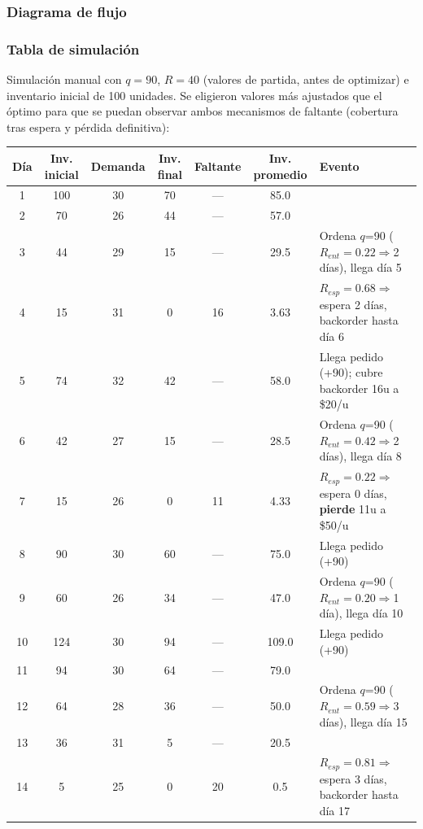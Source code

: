 \documentclass[12pt, a4paper]{article}
\begin{document}
\subsubsection{Diagrama de flujo}


\subsubsection{Tabla de simulación}

Simulación manual con $q=90$, $R=40$ (valores de partida, antes de optimizar) e inventario inicial de 100 unidades. Se eligieron valores más ajustados que el óptimo para que se puedan observar ambos mecanismos de faltante (cobertura tras espera y pérdida definitiva):

\begin{center}
\small
\begin{tabular}{ccccccl}
\toprule
Día & Inv. inicial & Demanda & Inv. final & Faltante & Inv. promedio & Evento \\
\midrule
1  & 100 & 30 & 70  & --- & 85.0  & \\
2  & 70  & 26 & 44  & --- & 57.0  & \\
3  & 44  & 29 & 15  & --- & 29.5  & Ordena $q$=90 ($R_{ent}=0.22\Rightarrow$2 días), llega día 5 \\
4  & 15  & 31 & 0   & 16  & 3.63  & $R_{esp}=0.68\Rightarrow$espera 2 días, backorder hasta día 6 \\
5  & 74  & 32 & 42  & --- & 58.0  & Llega pedido (+90); cubre backorder 16u a \$20/u \\
6  & 42  & 27 & 15  & --- & 28.5  & Ordena $q$=90 ($R_{ent}=0.42\Rightarrow$2 días), llega día 8 \\
7  & 15  & 26 & 0   & 11  & 4.33  & $R_{esp}=0.22\Rightarrow$espera 0 días, \textbf{pierde} 11u a \$50/u \\
8  & 90  & 30 & 60  & --- & 75.0  & Llega pedido (+90) \\
9  & 60  & 26 & 34  & --- & 47.0  & Ordena $q$=90 ($R_{ent}=0.20\Rightarrow$1 día), llega día 10 \\
10 & 124 & 30 & 94  & --- & 109.0 & Llega pedido (+90) \\
11 & 94  & 30 & 64  & --- & 79.0  & \\
12 & 64  & 28 & 36  & --- & 50.0  & Ordena $q$=90 ($R_{ent}=0.59\Rightarrow$3 días), llega día 15 \\
13 & 36  & 31 & 5   & --- & 20.5  & \\
14 & 5   & 25 & 0   & 20  & 0.5   & $R_{esp}=0.81\Rightarrow$espera 3 días, backorder hasta día 17 \\

\end{tabular}
\end{center}
\end{document}

